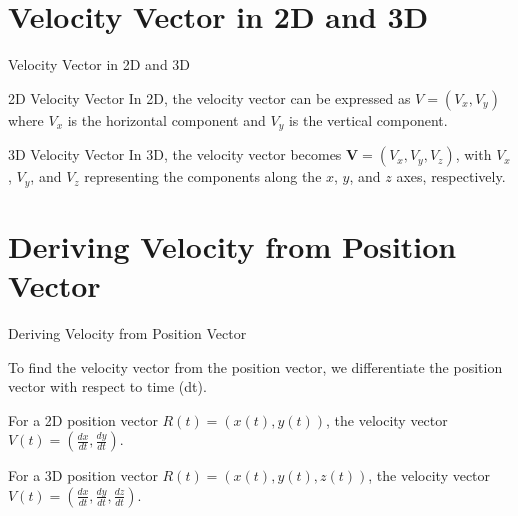 \documentclass{beamer}
\begin{document}
\section{Velocity Vector in 2D and 3D}

\begin{frame}[t]{Velocity Vector in 2D and 3D}
    \vspace{15pt} %

    \begin{block}{2D Velocity Vector}
        In 2D, the velocity vector can be expressed as $ V = (V_{x}, V_{y})$ where $V_{x}$ is the horizontal
        component and $V_{y}$ is the vertical component.
    \end{block}
    \vspace{5pt} %

    \begin{block}{3D Velocity Vector}
        In 3D, the velocity vector becomes $\mathbf{V} = (V_x, V_y, V_z)$, with $V_x$, $V_y$, and $V_z$ representing the components along the $x$, $y$, and $z$ axes, respectively.
    \end{block}
  
\end{frame}


\section{Deriving Velocity from Position Vector}

\begin{frame}{Deriving Velocity from Position Vector}

To find the velocity vector from the position vector, we differentiate the position vector with respect to time (dt).

\vspace{8pt}
For a 2D position vector $R(t) = (x(t), y(t))$, the velocity vector $V(t) = \left(\frac{dx}{dt}, \frac{dy}{dt}\right)$.

\vspace{8pt}
For a 3D position vector $R(t) = (x(t), y(t), z(t))$, the velocity vector $V(t) = \left(\frac{dx}{dt}, \frac{dy}{dt}, \frac{dz}{dt}\right)$.
\end{frame}
\end{document}
